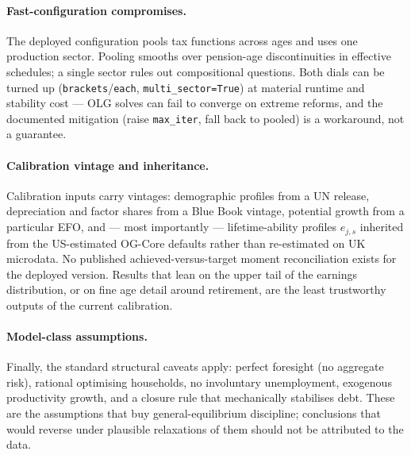 \paragraph{Fast-configuration compromises.} The deployed configuration pools tax functions across ages and uses one production sector. Pooling smooths over pension-age discontinuities in effective schedules; a single sector rules out compositional questions. Both dials can be turned up (\texttt{brackets}/\texttt{each}, \texttt{multi\_sector=True}) at material runtime and stability cost --- OLG solves can fail to converge on extreme reforms, and the documented mitigation (raise \texttt{max\_iter}, fall back to pooled) is a workaround, not a guarantee.

\paragraph{Calibration vintage and inheritance.} Calibration inputs carry vintages: demographic profiles from a UN release, depreciation and factor shares from a Blue Book vintage, potential growth from a particular EFO, and --- most importantly --- lifetime-ability profiles $e_{j,s}$ inherited from the US-estimated OG-Core defaults rather than re-estimated on UK microdata. No published achieved-versus-target moment reconciliation exists for the deployed version. Results that lean on the upper tail of the earnings distribution, or on fine age detail around retirement, are the least trustworthy outputs of the current calibration.

\paragraph{Model-class assumptions.} Finally, the standard structural caveats apply: perfect foresight (no aggregate risk), rational optimising households, no involuntary unemployment, exogenous productivity growth, and a closure rule that mechanically stabilises debt. These are the assumptions that buy general-equilibrium discipline; conclusions that would reverse under plausible relaxations of them should not be attributed to the data.
